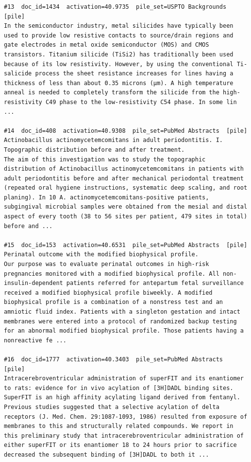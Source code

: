 \begin{verbatim}
#13  doc_id=1434  activation=40.9735  pile_set=USPTO Backgrounds  [pile]
In the semiconductor industry, metal silicides have typically been used to provide low resistive contacts to source/drain regions and gate electrodes in metal oxide semiconductor (MOS) and CMOS transistors. Titanium silicide (TiSi2) has traditionally been used because of its low resistivity. However, by using the conventional Ti-salicide process the sheet resistance increases for lines having a thickness of less than about 0.35 microns (μm). A high temperature anneal is needed to completely transform the silicide from the high-resistivity C49 phase to the low-resistivity C54 phase. In some lin ...

#14  doc_id=408  activation=40.9308  pile_set=PubMed Abstracts  [pile]
Actinobacillus actinomycetemcomitans in adult periodontitis. I. Topographic distribution before and after treatment.
The aim of this investigation was to study the topographic distribution of Actinobacillus actinomycetemcomitans in patients with adult periodontitis before and after mechanical periodontal treatment (repeated oral hygiene instructions, systematic deep scaling, and root planing). In 10 A. actinomycetemcomitans-positive patients, subgingival microbial samples were obtained from the mesial and distal aspect of every tooth (38 to 56 sites per patient, 479 sites in total) before and ...

#15  doc_id=153  activation=40.6531  pile_set=PubMed Abstracts  [pile]
Perinatal outcome with the modified biophysical profile.
Our purpose was to evaluate perinatal outcomes in high-risk pregnancies monitored with a modified biophysical profile. All non-insulin-dependent patients referred for antepartum fetal surveillance received a modified biophysical profile biweekly. A modified biophysical profile is a combination of a nonstress test and an amniotic fluid index. Patients with a singleton gestation and intact membranes were entered into a protocol of randomized backup testing for an abnormal modified biophysical profile. Those patients having a nonreactive fe ...

#16  doc_id=1777  activation=40.3403  pile_set=PubMed Abstracts  [pile]
Intracerebroventricular administration of superFIT and its enantiomer to rats: evidence for in vivo acylation of [3H]DADL binding sites.
SuperFIT is an high affinity acylating ligand derived from fentanyl. Previous studies suggested that a selective acylation of delta receptors (J. Med. Chem. 29:1087-1093, 1986) resulted from exposure of membranes to this and structurally related compounds. We report in this preliminary study that intracerebroventricular administration of either superFIT or its enantiomer 18 to 24 hours prior to sacrifice decreased the subsequent binding of [3H]DADL to both it ...


\end{verbatim}
